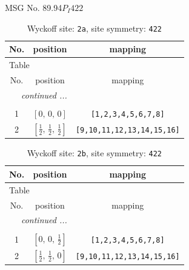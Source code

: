 \documentclass[fleqn,8pt]{jsarticle}
\begin{document}
\setcounter{MaxMatrixCols}{32}

\renewcommand{\tablename}{Table~}
\renewcommand{\figurename}{Figure~}
\begin{center}
\LARGE
MSG No. 89.94\quad$P_{I}422$
\end{center}
\renewcommand{\arraystretch}{1.2}
\begin{longtable}{ccc}
\caption{Wyckoff site: {\tt 2a}, site symmetry: {\tt 422}}
 \\
 \hline \hline
No. & position & mapping \\ \hline \endfirsthead

\multicolumn{2}{l}{\tablename\ \thetable{}} \\
 \hline \hline
No. & position & mapping \\ \hline \endhead

 \hline \hline
\multicolumn{2}{r}{\footnotesize\it continued ...} \\ \endfoot

 \hline \hline
\multicolumn{2}{r}{} \\ \endlastfoot

1 & $\left[ 0,\, 0,\, 0 \right]$ & {\tt [1,2,3,4,5,6,7,8]} \\ \hline
2 & $\left[ \frac{1}{2},\, \frac{1}{2},\, \frac{1}{2} \right]$ & {\tt [9,10,11,12,13,14,15,16]} \\
\end{longtable}
\renewcommand{\arraystretch}{1.2}
\begin{longtable}{ccc}
\caption{Wyckoff site: {\tt 2b}, site symmetry: {\tt 422}}
 \\
 \hline \hline
No. & position & mapping \\ \hline \endfirsthead

\multicolumn{2}{l}{\tablename\ \thetable{}} \\
 \hline \hline
No. & position & mapping \\ \hline \endhead

 \hline \hline
\multicolumn{2}{r}{\footnotesize\it continued ...} \\ \endfoot

 \hline \hline
\multicolumn{2}{r}{} \\ \endlastfoot

1 & $\left[ 0,\, 0,\, \frac{1}{2} \right]$ & {\tt [1,2,3,4,5,6,7,8]} \\ \hline
2 & $\left[ \frac{1}{2},\, \frac{1}{2},\, 0 \right]$ & {\tt [9,10,11,12,13,14,15,16]} \\
\end{longtable}
\end{document}
